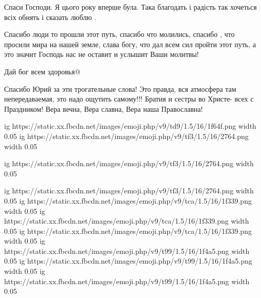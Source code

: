 \begin{itemize}
Спаси Господи. Я цього року вперше була. Така благодать і радість так хочеться всіх обнять і сказать люблю .

 

Спасибо люди то прошли этот путь, спасибо что молились, спасибо , что просили
мира на нашей земле, слава богу, что дал всем сил пройти этот путь, а это
значит Господь нас не оставит и услышит Ваши молитвы!

Дай бог всем здоровья@

 

Спасибо Юрий за эти трогательные слова! Это правда, вся атмосфера там
непередаваемая, это надо ощутить самому!!! Братия и сестры во Христе- всех с
Праздником! Вера вечна, Вера славна, Вера наша Православна!

\ifcmt
  ig https://static.xx.fbcdn.net/images/emoji.php/v9/td9/1.5/16/1f64f.png
  width 0.05
\fi
\ifcmt
  ig https://static.xx.fbcdn.net/images/emoji.php/v9/tf3/1.5/16/2764.png
  width 0.05

  ig https://static.xx.fbcdn.net/images/emoji.php/v9/tf3/1.5/16/2764.png
  width 0.05

  ig https://static.xx.fbcdn.net/images/emoji.php/v9/tf3/1.5/16/2764.png
  width 0.05
\fi
\ifcmt
  ig https://static.xx.fbcdn.net/images/emoji.php/v9/tca/1.5/16/1f339.png
  width 0.05
\fi
\ifcmt
  ig https://static.xx.fbcdn.net/images/emoji.php/v9/tca/1.5/16/1f339.png
  width 0.05
\fi
\ifcmt
  ig https://static.xx.fbcdn.net/images/emoji.php/v9/tca/1.5/16/1f339.png
  width 0.05
\fi
\ifcmt
  ig https://static.xx.fbcdn.net/images/emoji.php/v9/t99/1.5/16/1f4a5.png
  width 0.05
  ig https://static.xx.fbcdn.net/images/emoji.php/v9/t99/1.5/16/1f4a5.png
  width 0.05
  ig https://static.xx.fbcdn.net/images/emoji.php/v9/t99/1.5/16/1f4a5.png
  width 0.05
\fi

 


\end{itemize}
